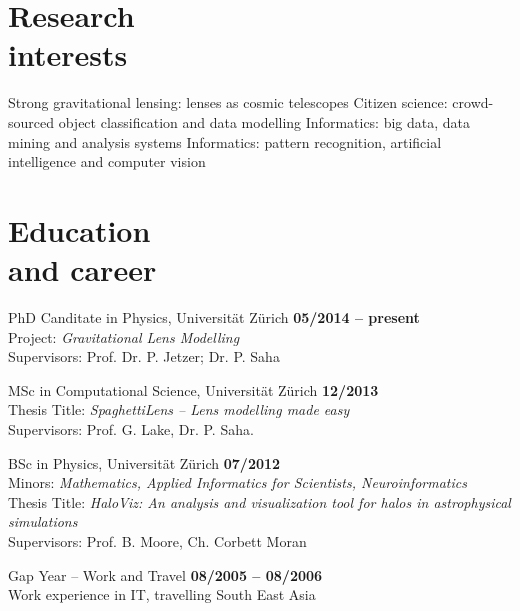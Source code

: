 \documentclass[margin,line]{resume}
\def\tb{\textbullet\;}
\begin{document}
\begin{resume}
\section{\mysidestyle Research\\interests}

  \tb Strong gravitational lensing: lenses as cosmic telescopes
  \tb Citizen science: crowd-sourced object classification and data modelling
  \tb Informatics: big data, data mining and analysis systems
  \tb Informatics: pattern recognition, artificial intelligence and computer vision


\section{\mysidestyle Education\\ and career}

\begin{list2}

  \item  PhD Canditate in Physics, Universität Zürich
  \hfill {\bf 05/2014 -- present}\\
  {\small Project: \emph{Gravitational Lens Modelling}\\
  Supervisors: Prof. Dr. P. Jetzer; Dr. P. Saha}

  \item MSc in Computational Science, Universität Zürich
  \hfill {\bf 12/2013}\\
  {\small Thesis Title: \emph{SpaghettiLens -- Lens modelling made easy} \\
  Supervisors: Prof. G. Lake, Dr. P. Saha}.

  \item BSc in Physics, Universität Zürich
  \hfill {\bf 07/2012}\\
  {\small Minors: \emph{Mathematics, Applied Informatics for Scientists, Neuroinformatics}\\
  Thesis Title: \emph{HaloViz: An analysis and visualization tool for halos in astrophysical simulations} \\
  Supervisors: Prof. B. Moore, Ch. Corbett Moran}

  \item Gap Year -- Work and Travel
  \hfill {\bf 08/2005 -- 08/2006}\\
  {\small Work experience in IT, travelling South East Asia}



\end{list2}
\end{resume}
\end{document}
